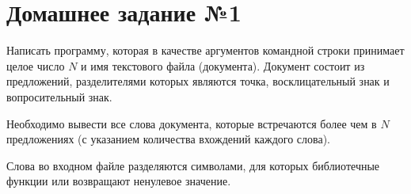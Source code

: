 \section*{Домашнее задание №1}

Написать программу, которая в качестве аргументов командной строки
принимает целое число $N$ и имя текстового файла (документа). Документ
состоит из предложений, разделителями которых являются точка,
восклицательный знак и вопросительный знак.

Необходимо вывести все
слова документа, которые встречаются более чем в $N$ предложениях (с
указанием количества вхождений каждого слова).

Слова во входном файле разделяются символами, для которых
библиотечные функции  или  возвращают ненулевое
значение.
